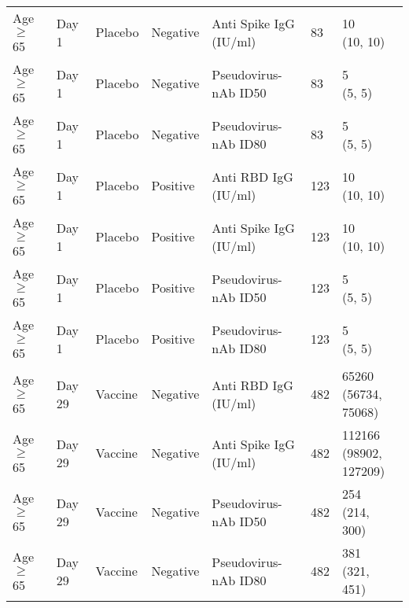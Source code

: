 \documentclass[]{book}
\theoremstyle{definition}
\theoremstyle{definition}
\theoremstyle{definition}
\newcommand{\1}{\mathbbm{1}}
\begin{document}
\begin{landscape}
\begin{ThreePartTable}
\begin{longtable}[t]{>{\raggedright\arraybackslash}p{7cm}llllll}
\hspace{1em}Age $\geq$ 65 & Day 1 & Placebo & Negative & Anti Spike IgG (IU/ml) & 83 & \makecell[l]{10\\(10, 10)}\\
\hspace{1em}Age $\geq$ 65 & Day 1 & Placebo & Negative & Pseudovirus-nAb ID50 & 83 & \makecell[l]{5\\(5, 5)}\\
\hspace{1em}Age $\geq$ 65 & Day 1 & Placebo & Negative & Pseudovirus-nAb ID80 & 83 & \makecell[l]{5\\(5, 5)}\\
\hspace{1em}Age $\geq$ 65 & Day 1 & Placebo & Positive & Anti RBD IgG (IU/ml) & 123 & \makecell[l]{10\\(10, 10)}\\
\hspace{1em}Age $\geq$ 65 & Day 1 & Placebo & Positive & Anti Spike IgG (IU/ml) & 123 & \makecell[l]{10\\(10, 10)}\\
\hspace{1em}Age $\geq$ 65 & Day 1 & Placebo & Positive & Pseudovirus-nAb ID50 & 123 & \makecell[l]{5\\(5, 5)}\\
\hspace{1em}Age $\geq$ 65 & Day 1 & Placebo & Positive & Pseudovirus-nAb ID80 & 123 & \makecell[l]{5\\(5, 5)}\\
\hspace{1em}Age $\geq$ 65 & Day 29 & Vaccine & Negative & Anti RBD IgG (IU/ml) & 482 & \makecell[l]{65260\\(56734, 75068)}\\
\hspace{1em}Age $\geq$ 65 & Day 29 & Vaccine & Negative & Anti Spike IgG (IU/ml) & 482 & \makecell[l]{112166\\(98902, 127209)}\\
\hspace{1em}Age $\geq$ 65 & Day 29 & Vaccine & Negative & Pseudovirus-nAb ID50 & 482 & \makecell[l]{254\\(214, 300)}\\
\hspace{1em}Age $\geq$ 65 & Day 29 & Vaccine & Negative & Pseudovirus-nAb ID80 & 482 & \makecell[l]{381\\(321, 451)}\\

\end{longtable}
\end{ThreePartTable}
\end{landscape}
\end{document}
